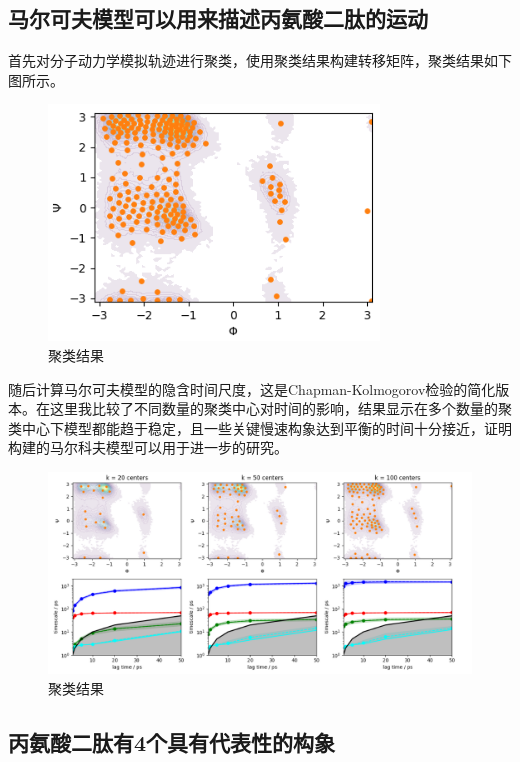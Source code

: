 \documentclass[a4paper]{article}
\begin{document}
\begin{CJK}{UTF8}{gbsn}
	

	\subsection{马尔可夫模型可以用来描述丙氨酸二肽的运动}

	首先对分子动力学模拟轨迹进行聚类，使用聚类结果构建转移矩阵，聚类结果如下图所示。
\begin{figure}[H]
\centering
\includegraphics[scale=0.75]{clus.png}
\caption{聚类结果}
\end{figure}

	随后计算马尔可夫模型的隐含时间尺度，这是Chapman-Kolmogorov检验的简化版本。在这里我比较了不同数量的聚类中心对时间的影响，结果显示在多个数量的聚类中心下模型都能趋于稳定，且一些关键慢速构象达到平衡的时间十分接近，证明构建的马尔科夫模型可以用于进一步的研究。


\begin{figure}[H]
\centering
\includegraphics[scale=0.55]{impied.png}
\caption{聚类结果}
\end{figure}


	\subsection{丙氨酸二肽有4个具有代表性的构象}






\end{CJK}
\end{document}
